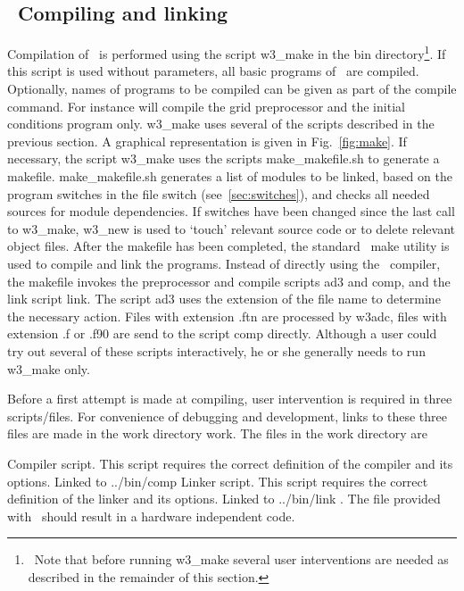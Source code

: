 \vssub
\subsection{~Compiling and linking} \label{sec:comp}
\vssub

Compilation of \ws\ is performed using the script {\file w3\_make} in the
{\dir bin} directory\footnote{~Note that before running {\file w3\_make}
  several user interventions are needed as described in the remainder of this
  section.}.  If this script is used without parameters, all basic programs of
\ws\ are compiled. Optionally, names of programs to be compiled can be given
as part of the compile command. For instance  will compile the grid preprocessor and the initial conditions
program only. {\file w3\_make} uses several of the scripts described in the
previous section. A graphical representation is given in Fig.~\ref{fig:make}.
If necessary, the script {\file w3\_make} uses the scripts {\file
  make\_makefile.sh} to generate a makefile. {\file make\_makefile.sh}
generates a list of modules to be linked, based on the program switches in the
file {\file switch} (see~\para\ref{sec:switches}), and checks all needed
sources for module dependencies. If switches have been changed since the last
call to {\file w3\_make}, {\file w3\_new} is used to `touch' relevant source
code or to delete relevant object files. After the makefile has been
completed, the standard \unix\ make utility is used to compile and link the
programs. Instead of directly using the \fortran\ compiler, the makefile
invokes the preprocessor and compile scripts {\file ad3} and {\file comp}, and
the link script {\file link}. The script {\file ad3} uses the extension of the
file name to determine the necessary action. Files with extension {\file .ftn}
are processed by {\code w3adc}, files with extension {\file .f} or {\file
  .f90} are send to the script {\code comp} directly.  Although a user could
try out several of these scripts interactively, he or she generally needs to
run {\file w3\_make} only.

 

\vspace{\baselineskip} \noindent 
Before a first attempt is made at compiling, user intervention is required in
three scripts/files. For convenience of debugging and development, links to
these three files are made in the work directory {\dir work}. The files in the
work directory are

\begin{flist}
  {Compiler script. This script requires the correct definition
             of the compiler and its options. Linked to {\file ../bin/comp}}
  {Linker script. This script requires the correct definition
             of the linker and its options. Linked to {\file ../bin/link}}
. The
             file provided with \ws\ should result in a hardware independent
             code.
\end{flist}

